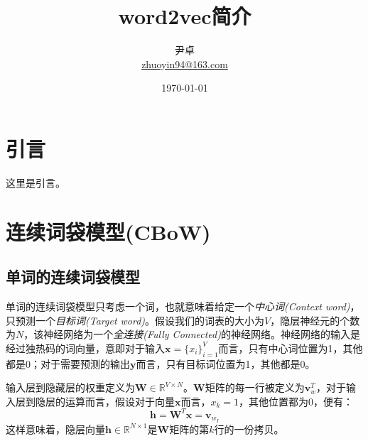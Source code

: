 \documentclass[UTF8, 12pt]{ctexart}
\begin{document}
	
\title{\heiti \Huge{word2vec简介}}
\author{\kaishu 尹卓 \\ \href{mailto:zhuoyin94@163.com}{zhuoyin94@163.com}}
\date{\today}
\maketitle

\tableofcontents
\newpage
\section{引言}
	这里是引言。
	
\section{连续词袋模型(CBoW)}
	
	\subsection{单词的连续词袋模型}
	单词的连续词袋模型只考虑一个词，也就意味着给定一个\emph{中心词(Context word)}，只预测一个\emph{目标词(Target word)}。假设我们的词表的大小为$V$，隐层神经元的个数为$N$，该神经网络为一个\emph{全连接(Fully Connected)}的神经网络。神经网络的输入是经过独热码的词向量，意即对于输入$\textbf{x} = \{x_{i}\}_{i=1}^{V}$而言，只有中心词位置为1，其他都是0；对于需要预测的输出$\textbf{y}$而言，只有目标词位置为1，其他都是0。
	
	输入层到隐藏层的权重定义为$\textbf{W} \in \mathbb{R}^{V \times N}$。$\textbf{W}$矩阵的每一行被定义为$\textbf{v}_{w}^{T}$，对于输入层到隐层的运算而言，假设对于向量$\textbf{x}$而言，$x_{k}=1$，其他位置都为0，便有：
	\begin{equation}
		\label{hiddenUnitVec}
		\textbf{h} = \textbf{W}^{T}\textbf{x}=\textbf{v}_{w_{I}}
	\end{equation}
	这样意味着，隐层向量$\textbf{h} \in \mathbb{R}^{N \times 1}$是$\textbf{W}$矩阵的第$k$行的一份拷贝。
	
\end{document}
